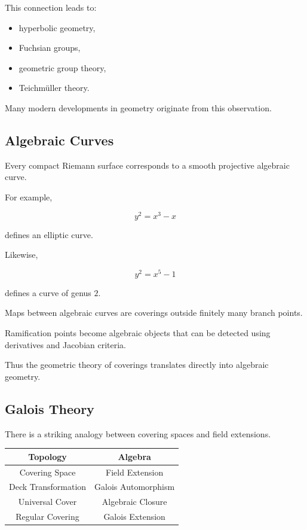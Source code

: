 \documentclass[12pt,a4paper]{article}
\theoremstyle{notespace}
\begin{document}
This connection leads to:

\begin{itemize}
	\item hyperbolic geometry,
	\item Fuchsian groups,
	\item geometric group theory,
	\item Teichmüller theory.
\end{itemize}

Many modern developments in geometry originate from this observation.

\subsection{Algebraic Curves}

Every compact Riemann surface corresponds to a smooth projective algebraic curve.

For example,

\[
y^2=x^3-x
\]

defines an elliptic curve.

Likewise,

\[
y^2=x^5-1
\]

defines a curve of genus \(2\).

Maps between algebraic curves are coverings outside finitely many branch points.

Ramification points become algebraic objects that can be detected using derivatives and Jacobian criteria.

Thus the geometric theory of coverings translates directly into algebraic geometry.

\subsection{Galois Theory}

There is a striking analogy between covering spaces and field extensions.

\begin{center}
	\renewcommand{\arraystretch}{1.3}
	\begin{tabular}{|c|c|}
		\hline
		Topology & Algebra \\
		\hline
		Covering Space & Field Extension \\
		Deck Transformation & Galois Automorphism \\
		Universal Cover & Algebraic Closure \\
		Regular Covering & Galois Extension \\
		\hline
	\end{tabular}
\end{center}
\end{document}
